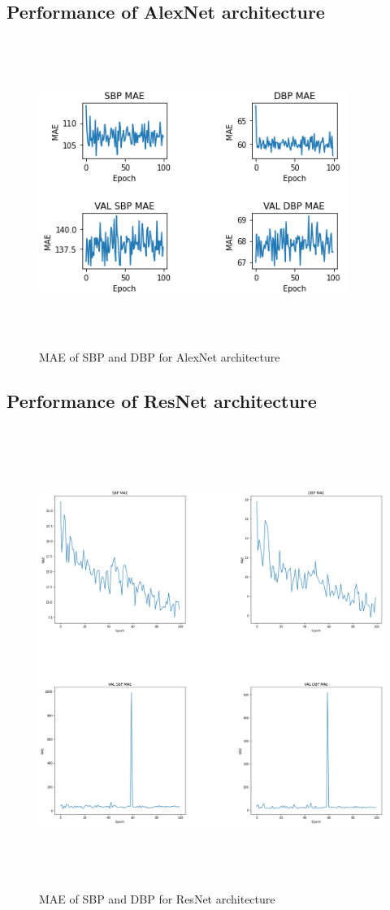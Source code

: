 \subsection{Performance of AlexNet architecture}

\begin{figure}[H]
    \centering
    \includegraphics[width=10cm,height=10cm,keepaspectratio]{Results/alexnet.png}
    \caption{MAE of SBP and DBP for AlexNet architecture}
    \label{alexnetResults}
\end{figure}

\subsection{Performance of ResNet architecture}

\begin{figure}[H]
    \centering
    \includegraphics[width=15cm,height=15cm,keepaspectratio]{Results/resnet.png}
    \caption{MAE of SBP and DBP for ResNet architecture}
    \label{resnetResults}
\end{figure}